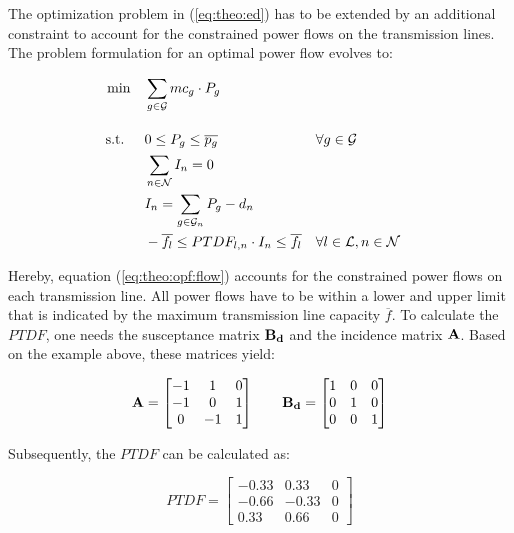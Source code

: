 The optimization problem in (\ref{eq:theo:ed}) has to be extended by an additional constraint to account for the constrained power flows on the transmission lines. The problem formulation for an optimal power flow evolves to:

\begin{subequations}
	\begin{align}
		 \min \quad & \sum_{g\in\mathcal{G}}mc_g \cdot P_{g} \label{eq:theo:opf} \\[10pt]
		 \text{s.t. } \quad & 0 \leq P_{g} \leq \overline{p_g} && \forall g \in \mathcal{G} \\
		 & \sum_{n \in \mathcal{N}} I_n = 0 \label{eq:theo:opf:balance} \\
		 & I_n = \sum_{g\in\mathcal{G}_n} P_g - d_n \label{eq:theo:opf:injection}  \\
		 & -\overline{f_l} \leq PTDF_{l,n} \cdot I_n \leq \overline{f_l} && \forall l \in \mathcal{L}, n \in \mathcal{N} \label{eq:theo:opf:flow}
	\end{align}
\end{subequations}

Hereby, equation (\ref{eq:theo:opf:flow}) accounts for the constrained power flows on each transmission line. All power flows have to be within a lower and upper limit that is indicated by the maximum transmission line capacity $\overline{f}$. To calculate the $PTDF$, one needs the susceptance matrix $\vb{B_d}$ and the incidence matrix $\vb{A}$. Based on the example above, these matrices yield:

\begin{equation}
	\vb{A} = \begin{bmatrix}
		-1 & 1 & 0 \\
		-1 & 0 & 1 \\
		0 & -1 & 1
	\end{bmatrix} \quad \quad 
	\vb{B_d} = \begin{bmatrix}
		1 & 0 & 0 \\
		0 & 1 & 0 \\
		0 & 0 & 1
	\end{bmatrix}
\end{equation}


Subsequently, the $PTDF$ can be calculated as:

\begin{equation}
	PTDF = \begin{bmatrix}
		-0.33 & 0.33 & 0 \\
		-0.66 & -0.33 & 0 \\
		0.33 & 0.66 & 0
	\end{bmatrix}
\end{equation}

